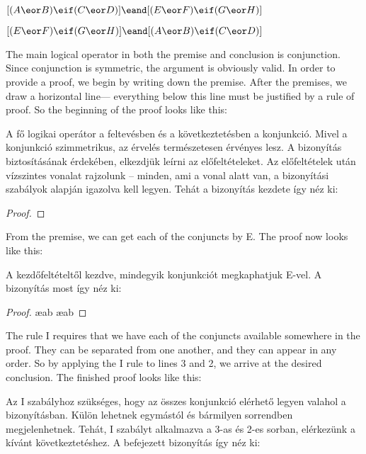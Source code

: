 \begin{earg}
\item[] $[(A\eor B)\eif(C\eor D)] \eand [(E \eor F) \eif (G\eor H)]$
\item[\therefore] $[(E \eor F) \eif (G\eor H)] \eand [(A\eor B)\eif(C\eor D)]$
\end{earg}
The main logical operator in both the premise and conclusion is conjunction. Since conjunction is symmetric, the argument is obviously valid. In order to provide a proof, we begin by writing down the premise. After the premises, we draw a horizontal line--- everything below this line must be justified by a rule of proof. So the beginning of the proof looks like this:

A fő logikai operátor a feltevésben és a következtetésben a konjunkció. Mivel a konjunkció szimmetrikus, az érvelés természetesen érvényes lesz. A bizonyítás biztosításának érdekében, elkezdjük leírni az előfeltételeket. Az előfeltételek után vízszintes vonalat rajzolunk -- minden, ami a vonal alatt van, a bizonyítási szabályok alapján igazolva kell legyen. Tehát a bizonyítás kezdete így néz ki:

\begin{proof}
\end{proof}

From the premise, we can get each of the conjuncts by {\eand}E. The proof now looks like this:

A kezdőfeltételtől kezdve, mindegyik konjunkciót megkaphatjuk {\eand}E-vel. A bizonyítás most így néz ki: 

\begin{proof}
	 \ae{ab}
	 \ae{ab}
\end{proof}

The rule {\eand}I requires that we have each of the conjuncts available somewhere in the proof. They can be separated from one another, and they can appear in any order. So by applying the {\eand}I rule to lines 3 and 2, we arrive at the desired conclusion. The finished proof looks like this:

Az {\eand}I szabályhoz szükséges, hogy az összes konjunkció elérhető legyen valahol a bizonyításban. Külön lehetnek egymástól és bármilyen sorrendben megjelenhetnek. Tehát, {\eand}I szabályt alkalmazva a 3-as és 2-es sorban, elérkezünk a kívánt következtetéshez. A befejezett bizonyítás így néz ki:

